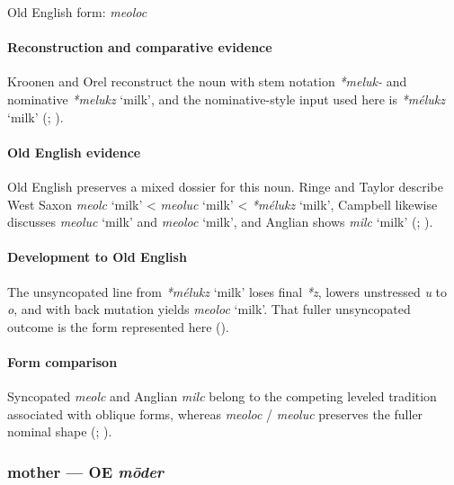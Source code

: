 \documentclass[
  british,
  a4paper,
]{article}
\providecommand{\Recon}[1]{\emph{*#1}}
\begin{document}
Old English form: \emph{meoloc}

\paragraph{Reconstruction and comparative
evidence}\label{reconstruction-and-comparative-evidence-42}

Kroonen and Orel reconstruct the noun with stem notation \emph{*meluk-}
and nominative \Recon{melukz} `milk', and the nominative-style input
used here is \Recon{mélukz} `milk' (; ).

\paragraph{Old English evidence}\label{old-english-evidence-42}

Old English preserves a mixed dossier for this noun. Ringe and Taylor
describe West Saxon \emph{meolc} `milk' \textless{} \emph{meoluc} `milk'
\textless{} \Recon{mélukz} `milk', Campbell likewise discusses
\emph{meoluc} `milk' and {\emph{meoloc}} `milk', and Anglian shows
\emph{milc} `milk' (; ).

\paragraph{Development to Old
English}\label{development-to-old-english-42}

The unsyncopated line from \Recon{mélukz} `milk' loses final \emph{*z},
lowers unstressed \emph{u} to \emph{o}, and with back mutation yields
{\emph{meoloc}} `milk'. That fuller unsyncopated outcome is the form
represented here ().

\paragraph{Form comparison}\label{form-comparison-2}

Syncopated \emph{meolc} and Anglian \emph{milc} belong to the competing
leveled tradition associated with oblique forms, whereas \emph{meoloc} /
\emph{meoluc} preserves the fuller nominal shape
(;
).

\subsubsection{\texorpdfstring{mother --- OE
\emph{mōder}}{mother --- OE mōder}}\label{mother-oe-mux14dder}
\end{document}
